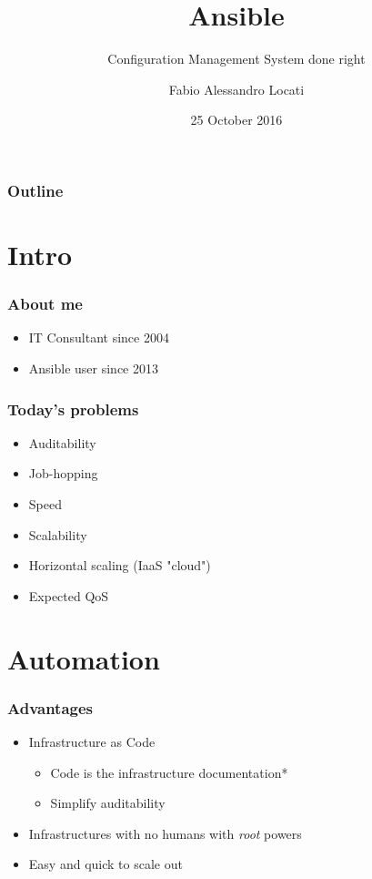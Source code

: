 \documentclass[t,aspectratio=169]{beamer}
\title{Ansible}
\subtitle{Configuration Management System done right}
\author{Fabio Alessandro Locati}
\date{25 October 2016}
\begin{document}
\maketitle

\begin{frame}
    \frametitle{Outline}
    \tableofcontents
\end{frame}

\section{Intro}
\begin{frame}
    \frametitle{About me}
    \begin{itemize}
        \item<2-> IT Consultant since 2004
        \item<3-> Ansible user since 2013
    \end{itemize}
\end{frame}

\begin{frame}
    \frametitle{Today's problems}
    \begin{itemize}
        \item<2-> Auditability
        \item<3-> Job-hopping
        \item<4-> Speed
        \item<5-> Scalability
        \item<6-> Horizontal scaling (IaaS "cloud")
        \item<7-> Expected QoS
    \end{itemize}
\end{frame}

\section{Automation}

\begin{frame}
    \frametitle{Advantages}
    \begin{itemize}
        \item<2-> Infrastructure as Code
        \begin{itemize}
            \item<3-> Code is the infrastructure documentation*
            \item<4-> Simplify auditability
        \end{itemize}
        \item<5-> Infrastructures with no humans with \textit{root} powers
        \item<6-> Easy and quick to scale out
    \end{itemize}
\end{frame}
\end{document}
